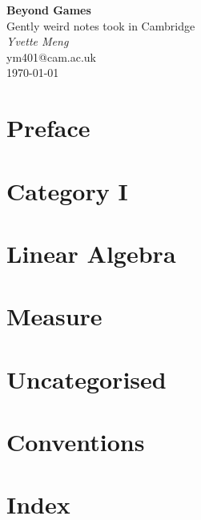 \documentclass[11pt,a4paper]{book}
\begin{document}
\frontmatter
\pagestyle{plain}

\begin{center}                  
\vspace{10cm} 

{\huge \textbf{Beyond Games}}\\
\vspace{5cm}
{\large Gently weird notes took in Cambridge}\\
\vspace{5cm}
{\Large \textit{Yvette Meng}}\\
\vspace{1cm}
{\large ym401@cam.ac.uk}\\
\vspace{1cm}
{\large \today}
\end{center}
\newpage

\tableofcontents
\newpage

\mainmatter

\chapter{Preface}

\newpage

\chapter{Category I}

\newpage

\chapter{Linear Algebra}

\newpage

\chapter{Measure}

\newpage

\chapter{Uncategorised}

\newpage

\appendix
\chapter{Conventions}

\newpage

\chapter{Index}

\end{document}

